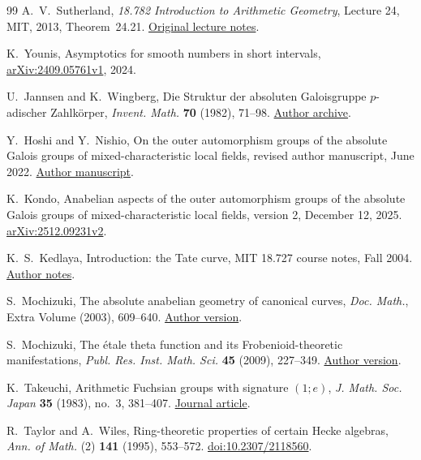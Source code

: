 \documentclass[11pt]{amsart}
\theoremstyle{definition}
\theoremstyle{remark}
\begin{document}
\begin{thebibliography}{99}
A.~V.~Sutherland, \emph{18.782 Introduction to Arithmetic Geometry},
Lecture 24, MIT, 2013, Theorem~24.21.
\href{https://math.mit.edu/classes/18.782/2013fa/LectureNotes24.pdf}{Original lecture notes}.

K.~Younis, Asymptotics for smooth numbers in short intervals,
\href{https://arxiv.org/abs/2409.05761v1}{arXiv:2409.05761v1}, 2024.

U.~Jannsen and K.~Wingberg, Die Struktur der absoluten Galoisgruppe
$p$-adischer Zahlk\"orper,
\emph{Invent. Math.} \textbf{70} (1982), 71--98.
\href{https://epub.uni-regensburg.de/26689/1/jannsen17.pdf}{Author archive}.

Y.~Hoshi and Y.~Nishio, On the outer automorphism groups of the absolute
Galois groups of mixed-characteristic local fields,
revised author manuscript, June 2022.
\href{https://www.kurims.kyoto-u.ac.jp/~yuichiro/rims1931revised.pdf}{Author manuscript}.

K.~Kondo, Anabelian aspects of the outer automorphism groups of the
absolute Galois groups of mixed-characteristic local fields,
version 2, December 12, 2025.
\href{https://arxiv.org/abs/2512.09231v2}{arXiv:2512.09231v2}.

K.~S.~Kedlaya, Introduction: the Tate curve,
MIT 18.727 course notes, Fall 2004.
\href{https://kskedlaya.org/18.727/tate-curve.pdf}{Author notes}.

S.~Mochizuki, The absolute anabelian geometry of canonical curves,
\emph{Doc. Math.}, Extra Volume (2003), 609--640.
\href{https://www.kurims.kyoto-u.ac.jp/~motizuki/Canonical\%20Liftings.pdf}{Author version}.

S.~Mochizuki, The \'etale theta function and its Frobenioid-theoretic
manifestations,
\emph{Publ. Res. Inst. Math. Sci.} \textbf{45} (2009), 227--349.
\href{https://www.kurims.kyoto-u.ac.jp/~motizuki/The\%20Etale\%20Theta\%20Function\%20and\%20its\%20Frobenioid-theoretic\%20Manifestations.pdf}{Author version}.

K.~Takeuchi, Arithmetic Fuchsian groups with signature $(1;e)$,
\emph{J. Math. Soc. Japan} \textbf{35} (1983), no.~3, 381--407.
\href{https://www.jstage.jst.go.jp/article/jmath1948/35/3/35_3_381/_pdf/-char/en}{Journal article}.

R.~Taylor and A.~Wiles,
Ring-theoretic properties of certain Hecke algebras,
\emph{Ann. of Math.} (2) \textbf{141} (1995), 553--572.
\href{https://doi.org/10.2307/2118560}{doi:10.2307/2118560}.


\end{thebibliography}
\end{document}
